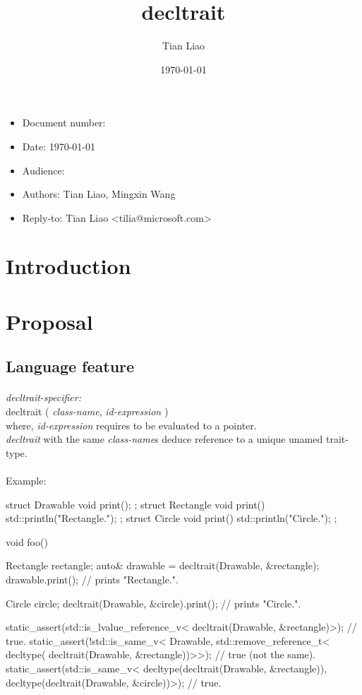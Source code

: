 \documentclass{article}
\title{decltrait}
\author{Tian Liao}
\date{\today}
\begin{document}
\maketitle
\vfill
\begin{itemize}[noitemsep]
  \item[] Document number:
  \item[] Date: \today
  \item[] Audience:
  \item[] Authors: Tian Liao, Mingxin Wang
  \item[] Reply-to: Tian Liao \textless tilia@microsoft.com\textgreater
\end{itemize}

\newpage
{}

\section{Introduction}

\section{Proposal}

\subsection{Language feature}
\paragraph{} \textit{decltrait-specifier:} \\
\indent decltrait ( \textit{class-name}, \textit{id-expression} ) \\
where, \textit{id-expression} requires to be evaluated to a pointer. \\
\textit{decltrait} with the same \textit{class-name}s deduce reference to a unique unamed trait-type.

\paragraph{} Example:
\begin{codeblock}
struct Drawable { void print(); };
struct Rectangle { void print() { std::println("Rectangle."); } };
struct Circle { void print() { std::println("Circle."); } };

void foo() {
  Rectangle rectangle;
  auto& drawable = decltrait(Drawable, &rectangle);
  drawable.print(); // prints "Rectangle.".

  Circle circle;
  decltrait(Drawable, &circle).print(); // prints "Circle.".

  static_assert(std::is_lvalue_reference_v<
    decltrait(Drawable, &rectangle)>); // true.
  static_assert(!std::is_same_v<
    Drawable,
    std::remove_reference_t<
      decltype(
        decltrait(Drawable, &rectangle))>>); // true (not the same).
  static_assert(std::is_same_v<
    decltype(decltrait(Drawable, &rectangle)),
    decltype(decltrait(Drawable, &circle))>); // true.
}
\end{codeblock}
\end{document}
